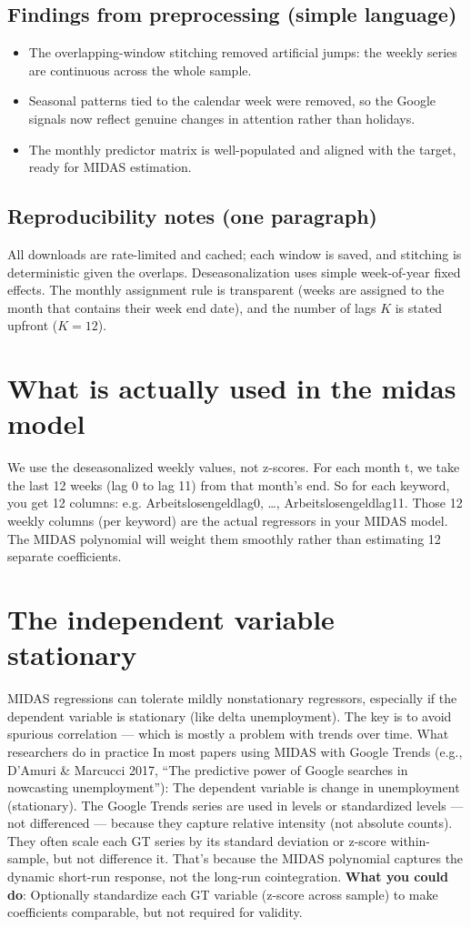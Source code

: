 \documentclass{article}
\begin{document}
\subsection{Findings from preprocessing (simple language)}
\begin{itemize}
  \item The overlapping-window stitching removed artificial jumps: the weekly series are continuous across the whole sample.
  \item Seasonal patterns tied to the calendar week were removed, so the Google signals now reflect genuine changes in attention rather than holidays.
  \item The monthly predictor matrix is well-populated and aligned with the target, ready for MIDAS estimation.
\end{itemize}

\subsection{Reproducibility notes (one paragraph)}
All downloads are rate-limited and cached; each window is saved, and stitching is deterministic given the overlaps. Deseasonalization uses simple week-of-year fixed effects. The monthly assignment rule is transparent (weeks are assigned to the month that contains their week end date), and the number of lags $K$ is stated upfront ($K=12$).


\section{What is actually used in the midas model}
We use the deseasonalized weekly values, not z-scores.
For each month t, we take the last 12 weeks (lag 0 to lag 11) from that month’s end.
So for each keyword, you get 12 columns:
e.g. Arbeitslosengeldlag0, …, Arbeitslosengeldlag11.
Those 12 weekly columns (per keyword) are the actual regressors in your MIDAS model.
The MIDAS polynomial will weight them smoothly rather than estimating 12 separate coefficients.

\section{The independent variable stationary}
MIDAS regressions can tolerate mildly nonstationary regressors, especially if the dependent variable is stationary (like delta unemployment).
The key is to avoid spurious correlation — which is mostly a problem with trends over time.
 What researchers do in practice
In most papers using MIDAS with Google Trends (e.g., D’Amuri \& Marcucci 2017, “The predictive power of Google searches in nowcasting unemployment”):
The dependent variable is change in unemployment (stationary).
The Google Trends series are used in levels or standardized levels — not differenced — because they capture relative intensity (not absolute counts).
They often scale each GT series by its standard deviation or z-score within-sample, but not difference it.
That’s because the MIDAS polynomial captures the dynamic short-run response, not the long-run cointegration.
\textbf{What you could do}: Optionally standardize each GT variable (z-score across sample) to make coefficients comparable, but not required for validity.
\end{document}
